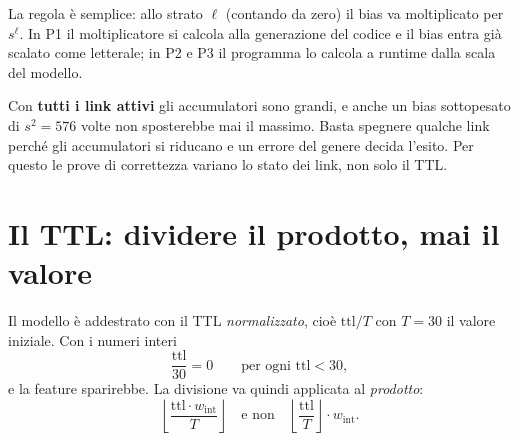 \documentclass[11pt,a4paper,oneside]{report}
\begin{document}
\begin{center}
\end{center}

La regola è semplice: allo strato $\ell$ (contando da zero) il bias va
moltiplicato per $s^{\ell}$. In P1 il moltiplicatore si calcola alla
generazione del codice e il bias entra già scalato come letterale; in P2 e P3
il programma lo calcola a runtime dalla scala del modello.

\begin{prima}
Con \textbf{tutti i link attivi} gli accumulatori sono grandi, e anche un bias
sottopesato di $s^2 = 576$ volte non sposterebbe mai il massimo. Basta spegnere
qualche link perché gli accumulatori si riducano e un errore del genere decida
l'esito. Per questo le prove di correttezza variano lo stato dei link, non solo
il TTL.
\end{prima}

\section{Il TTL: dividere il prodotto, mai il valore}
\label{sec:ttl}

Il modello è addestrato con il TTL \emph{normalizzato}, cioè
$\text{ttl}/T$ con $T = 30$ il valore iniziale. Con i numeri interi
\[
  \frac{\text{ttl}}{30} = 0 \qquad \text{per ogni } \text{ttl} < 30 ,
\]
e la feature sparirebbe. La divisione va quindi applicata al \emph{prodotto}:
\[
  \left\lfloor \frac{\text{ttl} \cdot w_{\text{int}}}{T} \right\rfloor
  \quad\text{e non}\quad
  \left\lfloor \frac{\text{ttl}}{T} \right\rfloor \cdot w_{\text{int}} .
\]
\end{document}
